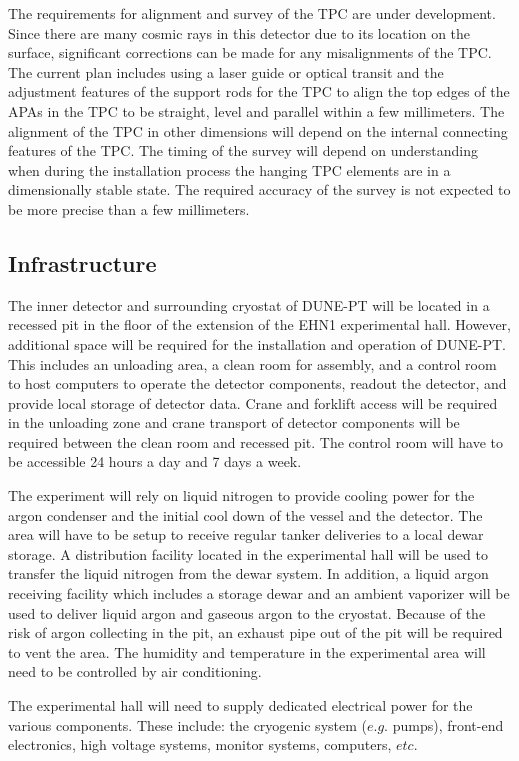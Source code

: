 The requirements for alignment and survey of the TPC are under development. Since there are many cosmic rays in this detector due to its location on the surface, significant corrections can be made for any misalignments of the TPC. The current plan includes using a laser guide or optical transit and the adjustment features of the support rods for the TPC to align the top edges of the APAs in the TPC to be straight, level and parallel within a few millimeters. The alignment of the TPC in other dimensions will depend on the internal connecting features of the TPC.  The timing of the survey will depend on understanding when during the installation process the hanging TPC elements are in a dimensionally stable state. The required accuracy of the survey is not expected to be more precise than a few millimeters.  


\subsection{Infrastructure}

The inner detector and surrounding cryostat of DUNE-PT will be located in a recessed pit in the floor of the extension of the EHN1 experimental hall.  However, additional space will be required for the installation and operation of DUNE-PT.  This includes an unloading area, a clean room for assembly, and a control room to host computers to operate the detector components, readout the detector, and provide local storage of detector data.  Crane and forklift access will be required in the unloading zone and crane transport of detector components will be required between the clean room and recessed pit.  The control room will have to be accessible 24 hours a day and 7 days a week.

The experiment will rely on liquid nitrogen to provide cooling power for the argon condenser and the initial cool down of the vessel and the detector.  The area will have to be setup to receive regular tanker deliveries to a local dewar storage.  A distribution facility located in the experimental hall will be used to transfer the liquid nitrogen from the dewar system.  In addition, a liquid argon receiving facility which includes a storage dewar and an ambient vaporizer will be used to deliver liquid argon and gaseous argon to the cryostat.  Because of the risk of argon collecting in the pit, an exhaust pipe out of the pit will be required to vent the area.  The humidity and temperature in the experimental area will need to be controlled by air conditioning.   

The experimental hall will need to supply dedicated electrical power for the various components. These include:
the cryogenic system ($e.g.$ pumps), front-end electronics, high voltage systems, monitor systems, computers, $etc.$


